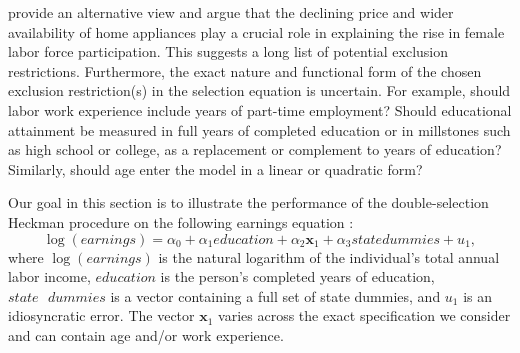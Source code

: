 \documentclass[11pt]{article}
\begin{document}
\cite{cavalcanti:08}
provide an alternative view and argue that the declining price and wider
availability of home appliances play a crucial role in explaining the rise in
female labor force participation. This suggests a long list of %
potential exclusion restrictions. %
Furthermore, the exact nature and
functional form of the chosen exclusion restriction(s) in the selection
equation is uncertain. %
For example, %
should %
labor work experience %
include years of %
part-time employment? %
Should %
educational attainment %
be measured in %
full
years of completed education %
or %
in millstones 
such as high school or college, %
as a replacement or complement to years of education?
Similarly, should age %
enter the model in a linear or %
quadratic form? %

Our %
goal in this section is to illustrate the performance of the double-selection Heckman procedure on %
the following earnings equation : 
\begin{equation}
\log\left(  earnings\right)
=\alpha_{0}+\alpha_{1}education+\alpha_{2}\mathbf{x}_1+\alpha_{3}state\text{
}dummies+u_1,\label{wreg}
\end{equation}
where $\log\left  (earnings\right)$ is the natural logarithm of the individual's
total annual labor income, $education$ is the person's completed years of
education, $state\text{ }dummies$ is a vector containing a full set of state
dummies, and $u_1$ is an idiosyncratic error.  The vector $\mathbf{x}_1$ varies
across the exact specification we consider %
and can
contain age and/or work experience. %
\end{document}
